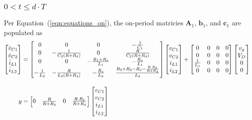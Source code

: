\subsubsection{$0 < t \leq d \cdot T$}
Per Equation~(\ref{eqn:equations_on}), the on-period matricies $\boldsymbol{A}_1$, $\boldsymbol{b}_1$, and $\boldsymbol{c}_1$ are populated as
\begin{align*}
\begin{bmatrix}
\dispdot{v_{C1}} \\ \dispdot{v_{C2}} \\ \dispdot{i_{L1}} \\ \dispdot{i_{L2}}
\end{bmatrix}
&=
\begin{bmatrix}
0 & 0 & 0 & \minus\frac{1}{C_1}\\
0 & \minus\frac{1}{C_2(R + R_4)} & 0 & \frac{R}{C_2(R + R_4)}\\
0 & 0 & \minus\frac{R_1 + R_o}{L_1} & \minus\frac{R_o}{L_1}\\
\minus\frac{1}{L_2} & \minus\frac{R}{L_2(R + R_4)} & \minus\frac{R_o}{L_2} & \frac{R_2 + R_3 - R_o - \frac{R \cdot R_4}{R + R_4}}{L_2}
\end{bmatrix}
\begin{bmatrix}
v_{C1} \\ v_{C2} \\ i_{L1} \\ i_{L2}
\end{bmatrix}
+
\begin{bmatrix}
0 & 0 & 0 & 0\\
0 & 0 & 0 & 0\\
\frac{1}{L_1} & 0 & 0 & 0\\
0 & 0 & 0 & 0
\end{bmatrix}
\begin{bmatrix}
v_g \\ V_D \\ 0 \\ 0
\end{bmatrix}
\\[11pt]
y &=
\begin{bmatrix}
0 & \frac{R}{R + R_4} & 0 & \frac{R \cdot R_4}{R + R_4}
\end{bmatrix}
\begin{bmatrix}
v_{C1} \\ v_{C2} \\ i_{L1} \\ i_{L2}
\end{bmatrix}
\end{align*}
